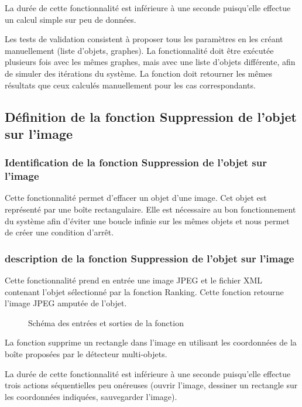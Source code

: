 \documentclass[debug,nodate,hideweeklyreports,noposter]{polytech/polytech}
\begin{document}
La durée de cette fonctionnalité est inférieure à une seconde puisqu'elle effectue un calcul simple sur peu de données.

Les tests de validation consistent à proposer tous les paramètres en les créant manuellement (liste d'objets, graphes). La fonctionnalité doit être exécutée plusieurs fois avec les mêmes graphes, mais avec une liste d'objets différente, afin de simuler des itérations du système. La fonction doit retourner les mêmes résultats que ceux calculés manuellement pour les cas correspondants.

\subsection{Définition de la fonction Suppression de l'objet sur l'image}

\subsubsection{Identification de la fonction Suppression de l'objet sur l'image}

Cette fonctionnalité permet d’effacer un objet d’une image. Cet objet est représenté par une boîte rectangulaire. 
Elle est nécessaire au bon fonctionnement du système afin d’éviter une boucle infinie sur les mêmes objets et nous permet de créer une condition d’arrêt.

\subsubsection{description de la fonction Suppression de l'objet sur l'image}

Cette fonctionnalité prend en entrée une image JPEG et le fichier XML contenant l’objet sélectionné par la fonction Ranking. Cette fonction retourne l’image JPEG amputée de l’objet.

\begin{figure}
  \caption{Schéma des entrées et sorties de la fonction}
  \label{fig:cropexpli}
\end{figure}

La fonction supprime un rectangle dans l’image en utilisant les coordonnées de la boîte proposées par le détecteur multi-objets. 

La durée de cette fonctionnalité est inférieure à une seconde puisqu'elle effectue trois actions séquentielles peu onéreuses (ouvrir l'image, dessiner un rectangle sur les coordonnées indiquées, sauvegarder l'image).
\end{document}
